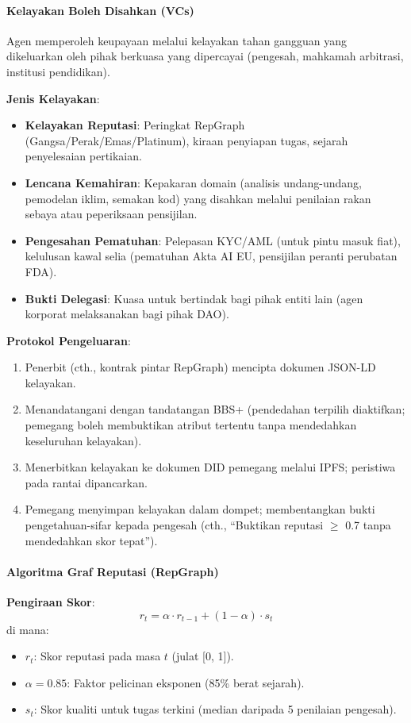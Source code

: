 \documentclass[11pt]{article}
\begin{document}
\paragraph{Kelayakan Boleh Disahkan (VCs)}
Agen memperoleh keupayaan melalui kelayakan tahan gangguan yang dikeluarkan oleh pihak berkuasa yang dipercayai (pengesah, mahkamah arbitrasi, institusi pendidikan).

\textbf{Jenis Kelayakan}:
\begin{itemize}[noitemsep]
  \item \textbf{Kelayakan Reputasi}: Peringkat RepGraph (Gangsa/Perak/Emas/Platinum), kiraan penyiapan tugas, sejarah penyelesaian pertikaian.
  \item \textbf{Lencana Kemahiran}: Kepakaran domain (analisis undang-undang, pemodelan iklim, semakan kod) yang disahkan melalui penilaian rakan sebaya atau peperiksaan pensijilan.
  \item \textbf{Pengesahan Pematuhan}: Pelepasan KYC/AML (untuk pintu masuk fiat), kelulusan kawal selia (pematuhan Akta AI EU, pensijilan peranti perubatan FDA).
  \item \textbf{Bukti Delegasi}: Kuasa untuk bertindak bagi pihak entiti lain (agen korporat melaksanakan bagi pihak DAO).
\end{itemize}

\textbf{Protokol Pengeluaran}:
\begin{enumerate}[noitemsep]
  \item Penerbit (cth., kontrak pintar RepGraph) mencipta dokumen JSON-LD kelayakan.
  \item Menandatangani dengan tandatangan BBS+ (pendedahan terpilih diaktifkan; pemegang boleh membuktikan atribut tertentu tanpa mendedahkan keseluruhan kelayakan).
  \item Menerbitkan kelayakan ke dokumen DID pemegang melalui IPFS; peristiwa pada rantai dipancarkan.
  \item Pemegang menyimpan kelayakan dalam dompet; membentangkan bukti pengetahuan-sifar kepada pengesah (cth., ``Buktikan reputasi $\geq$ 0.7 tanpa mendedahkan skor tepat'').
\end{enumerate}

\paragraph{Algoritma Graf Reputasi (RepGraph)}

\textbf{Pengiraan Skor}:
\begin{equation}
r_t = \alpha \cdot r_{t-1} + (1 - \alpha) \cdot s_t
\end{equation}
di mana:
\begin{itemize}[noitemsep]
  \item $r_t$: Skor reputasi pada masa $t$ (julat [0, 1]).
  \item $\alpha = 0.85$: Faktor pelicinan eksponen (85\% berat sejarah).
  \item $s_t$: Skor kualiti untuk tugas terkini (median daripada 5 penilaian pengesah).
\end{itemize}
\end{document}
